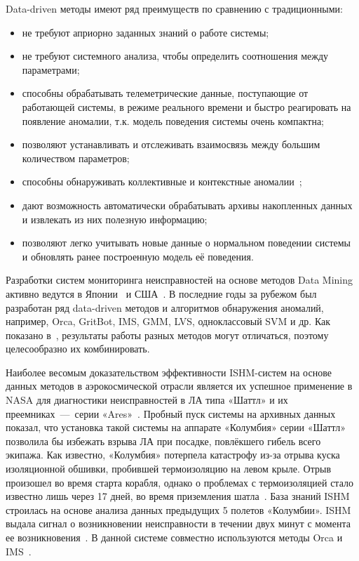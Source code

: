 Data-driven методы имеют ряд преимуществ по сравнению с традиционными:
\begin{itemize}
	\item не требуют априорно заданных знаний о работе системы;
	\item не требуют системного анализа, чтобы определить соотношения между параметрами;
	\item способны обрабатывать телеметрические данные, поступающие от работающей системы, в режиме реального времени и быстро реагировать на появление аномалии, т.к. модель поведения системы очень компактна;
	\item позволяют устанавливать и отслеживать взаимосвязь между большим количеством параметров;
	\item способны обнаруживать коллективные и контекстные аномалии~\cite{AnomalyDetectionASurvey};
	\item дают возможность автоматически обрабатывать архивы накопленных данных и извлекать из них полезную информацию;
	\item позволяют легко учитывать новые данные о нормальном поведении системы и обновлять ранее построенную модель её поведения.
\end{itemize}

\smallskip
Разработки систем мониторинга неисправностей на основе методов Data Mining активно ведутся в Японии~\cite{FaultDetectionByMiningAssocRules} и США~\cite{IversonGeneralPurposeDDSM, IversonISHM}. В последние годы за рубежом был разработан ряд data-driven методов и алгоритмов обнаружения аномалий, например, Orca, GritBot, IMS, GMM, LVS, одноклассовый SVM и др. Как показано в~\cite{MartinCompUnsupervisedDetectionMethods}, результаты работы разных методов могут отличаться, поэтому целесообразно их комбинировать.

Наиболее весомым доказательством эффективности ISHM-систем на основе данных методов в аэрокосмической отрасли является их успешное применение в NASA для диагностики неисправностей в ЛА типа «Шаттл» и их преемниках~---~серии «Ares»~\cite{IversonGeneralPurposeDDSM}. Пробный пуск системы на архивных данных показал, что установка такой системы на аппарате «Колумбия» серии «Шаттл» позволила бы избежать взрыва ЛА при посадке, повлёкшего гибель всего экипажа. Как известно, «Колумбия» потерпела катастрофу из-за отрыва куска изоляционной обшивки, пробившей термоизоляцию на левом крыле. Отрыв произошел во время старта корабля, однако о проблемах с термоизоляцией стало известно лишь через 17 дней, во время приземления шатла~\cite{ColumbiaAccidentReport}. База знаний ISHM строилась на основе анализа данных предыдущих 5 полетов «Колумбии». ISHM выдала сигнал о возникновении неисправности в течении двух минут с момента ее возникновения~\cite{IversonISHM, DerevyanenkoDataMining}. В данной системе совместно используются методы Orca и IMS~\cite{IversonSHMforSpaceMissionOperations}.

